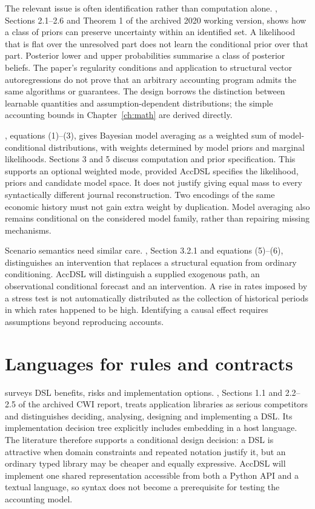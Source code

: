 The relevant issue is often identification rather than computation alone.
\citet{giacomini2021}, Sections 2.1--2.6 and Theorem 1 of the archived 2020
working version, shows how a class of priors can preserve uncertainty within
an identified set. A likelihood that is flat over the unresolved part does
not learn the conditional prior over that part. Posterior lower and upper
probabilities summarise a class of posterior beliefs. The paper's regularity
conditions and application to structural vector autoregressions do not prove
that an arbitrary accounting program admits the same algorithms or guarantees.
The design borrows the distinction between learnable quantities and
assumption-dependent distributions; the simple accounting bounds in
Chapter~\ref{ch:math} are derived directly.

\citet{hoeting1999}, equations (1)--(3), gives Bayesian model averaging as a
weighted sum of model-conditional distributions, with weights determined by
model priors and marginal likelihoods. Sections 3 and 5 discuss computation
and prior specification. This supports an optional weighted mode, provided
AccDSL specifies the likelihood, priors and candidate model space. It does
not justify giving equal mass to every syntactically different journal
reconstruction. Two encodings of the same economic history must not gain extra
weight by duplication. Model averaging also remains conditional on the
considered model family, rather than repairing missing mechanisms.

Scenario semantics need similar care. \citet{pearl2009}, Section 3.2.1 and
equations (5)--(6), distinguishes an intervention that replaces a structural
equation from ordinary conditioning. AccDSL will distinguish a supplied
exogenous path, an observational conditional forecast and an intervention.
A rise in rates imposed by a stress test is not automatically distributed as
the collection of historical periods in which rates happened to be high.
Identifying a causal effect requires assumptions beyond reproducing accounts.

\section{Languages for rules and contracts}

\citet{vandeursen2000} surveys DSL benefits, risks and implementation options.
\citet{mernik2005}, Sections 1.1 and 2.2--2.5 of the archived CWI report,
treats application libraries as serious competitors and distinguishes deciding,
analysing, designing and implementing a DSL. Its implementation decision tree
explicitly includes embedding in a host language. The literature therefore
supports a conditional design decision: a DSL is attractive when domain
constraints and repeated notation justify it, but an ordinary typed library
may be cheaper and equally expressive. AccDSL will implement one shared
representation accessible from both a Python API and a textual language, so
syntax does not become a prerequisite for testing the accounting model.

